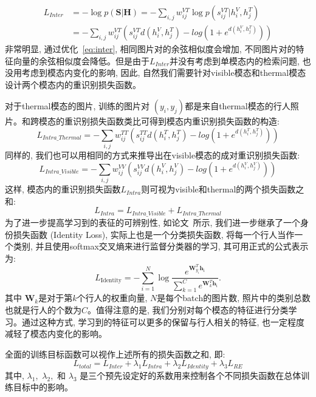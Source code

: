 \begin{equation}
  \begin{aligned}
     L_{Inter} &= -\log{ p(\mathbf{S}|\mathbf{H})} 
      =  -\sum_{i, j}w^{VT}_{ij}\log{p(s^{VT}_{ij}|h_i^V,h_j^T)} \\
      &= -\sum_{i,j}w^{VT}_{ij}(s^{VT}_{ij}d(h_i^V,h_j^T)-log(1+e^{d(h_i^V,h_j^T)}))
 \end{aligned}
 \label{eq:inter}
  \end{equation}
非常明显, 通过优化~\ref{eq:inter}, 相同图片对的余弦相似度会增加, 不同图片对的特征向量的余弦相似度会降低。但是由于$L_{Inter}$并没有考虑到单模态内的检索问题, 也没用考虑到模态内变化的影响, 因此, 自然我们需要针对visible模态和thermal模态设计两个模态内的重识别损失函数。\par
对于thermal模态的图片, 训练的图片对 $(y_i, y_j)$都是来自thermal模态的行人照片。和跨模态的重识别损失函数类比可得到模态内重识别损失函数的构造:
\begin{equation}
  L_{Intra\_Thermal} = -\sum_{i,j}w^{TT}_{ij}(s^{TT}_{ij}d(h_i^T,h_j^T)-log(1+e^{d(h_i^T,h_j^T)}))
  \label{eq:intrathermal}
\end{equation}
同样的, 我们也可以用相同的方式来推导出在visible模态的成对重识别损失函数:
\begin{equation}
  L_{Intra\_Visible} = -\sum_{i,j}w^{VV}_{ij}(s^{VV}_{ij}d(h_i^V,h_j^V)-log(1+e^{d(h_i^V,h_j^V)}))
  \label{eq:intravisible}
\end{equation}
这样, 模态内的重识别损失函数$L_{Intra}$则可视为visible和thermal的两个损失函数之和:
\begin{equation}
  L_{Intra} = L_{Intra\_Visible} + L_{Intra\_Thermal}
\label{eq:Intra}
\end{equation}
为了进一步提高学习到的表征的可辨别性, 如论文~\cite{ye2018visible}所示, 我们进一步继承了一个身份损失函数 (Identity Loss), 实际上也是一个分类损失函数, 将每一个行人当作一个类别, 并且使用softmax交叉熵来进行监督分类器的学习, 其可用正式的公式表示为:
\begin{equation}
  L_{\text {Identity}}=-\sum_{i=1}^N \log \frac{e^{\mathbf{W}_{y_i}^T \mathbf{h}_{\mathrm{i}}}}{\sum_{k=1}^C e^{\mathbf{W}_k^T \mathbf{h}_{\mathrm{i}}}}.
  \label{eq:identity}
\end{equation} 
其中 $\mathbf{W}_k$是对于第$k$个行人的权重向量, $N$是每个batch的图片数, 照片中的类别总数也就是行人的个数为$C$。值得注意的是, 我们分别对每个模态的特征进行分类学习。通过这种方式, 学习到的特征可以更多的保留与行人相关的特征, 也一定程度减轻了模态内变化的影响。\par
全面的训练目标函数可以视作上述所有的损失函数之和, 即:
\begin{equation}
  L_{total} = L_{Inter}+\lambda_1L_{Intra}+\lambda_2L_{Identity} + \lambda_3L_{RE}
\label{eq:total}
\end{equation}
其中, $\lambda_1$,~$\lambda_2$,~和 $\lambda_3$ 是三个预先设定好的系数用来控制各个不同损失函数在总体训练目标中的影响。

